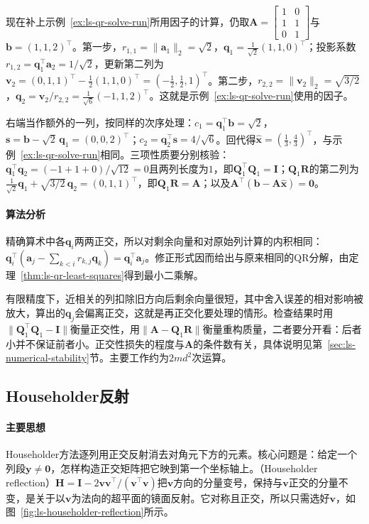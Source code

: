 \begin{example}
\label{ex:ls-mgs-run}
现在补上示例~\ref{ex:ls-qr-solve-run}所用因子的计算，仍取$\bm A=\left[\begin{smallmatrix}1&0\\1&1\\0&1\end{smallmatrix}\right]$与$\bm b=(1,1,2)^\top$。第一步，$r_{1,1}=\lVert\bm a_1\rVert_2=\sqrt2$，$\bm q_1=\tfrac1{\sqrt2}(1,1,0)^\top$；投影系数$r_{1,2}=\bm q_1^\top\bm a_2=1/\sqrt2$，更新第二列为$\bm v_2=(0,1,1)^\top-\tfrac12(1,1,0)^\top=(-\tfrac12,\tfrac12,1)^\top$。第二步，$r_{2,2}=\lVert\bm v_2\rVert_2=\sqrt{3/2}$，$\bm q_2=\bm v_2/r_{2,2}=\tfrac1{\sqrt6}(-1,1,2)^\top$。这就是示例~\ref{ex:ls-qr-solve-run}使用的因子。

右端当作额外的一列，按同样的次序处理：$c_1=\bm q_1^\top\bm b=\sqrt2$，$\bm s=\bm b-\sqrt2\,\bm q_1=(0,0,2)^\top$；$c_2=\bm q_2^\top\bm s=4/\sqrt6$。回代得$\hat{\bm x}=(\tfrac13,\tfrac43)^\top$，与示例~\ref{ex:ls-qr-solve-run}相同。三项性质要分别核验：$\bm q_1^\top\bm q_2=(-1+1+0)/\sqrt{12}=0$且两列长度为$1$，即$\bm Q_1^\top\bm Q_1=\bm I$；$\bm Q_1\bm R$的第二列为$\tfrac1{\sqrt2}\bm q_1+\sqrt{3/2}\,\bm q_2=(0,1,1)^\top$，即$\bm Q_1\bm R=\bm A$；以及$\bm A^\top(\bm b-\bm A\hat{\bm x})=\bm0$。
\end{example}

\paragraph{算法分析}
精确算术中各$\bm q_i$两两正交，所以对剩余向量和对原始列计算的内积相同：$\bm q_i^\top(\bm a_j-\sum_{k<i}r_{k,j}\bm q_k)=\bm q_i^\top\bm a_j$。修正形式因而给出与原来相同的QR分解，由定理~\ref{thm:ls-qr-least-squares}得到最小二乘解。

有限精度下，近相关的列扣除旧方向后剩余向量很短，其中舍入误差的相对影响被放大，算出的$\bm q_j$会偏离正交，这就是再正交化要处理的情形。检查结果时用$\lVert\bm Q_1^\top\bm Q_1-\bm I\rVert$衡量正交性，用$\lVert\bm A-\bm Q_1\bm R\rVert$衡量重构质量，二者要分开看：后者小并不保证前者小。正交性损失的程度与$\bm A$的条件数有关，具体说明见第~\ref{sec:ls-numerical-stability}节。主要工作约为$2md^2$次运算。

\subsection{Householder反射}
\label{sec:ls-householder}

\paragraph{主要思想}
Householder方法逐列用正交反射消去对角元下方的元素。核心问题是：给定一个列段$\bm y\neq\bm0$，怎样构造正交矩阵把它映到第一个坐标轴上。（Householder reflection）$\bm H=\bm I-2\bm v\bm v^\top/(\bm v^\top\bm v)$把$\bm v$方向的分量变号，保持与$\bm v$正交的分量不变，是关于以$\bm v$为法向的超平面的镜面反射。它对称且正交，所以只需选好$\bm v$，如图~\ref{fig:ls-householder-reflection}所示。

